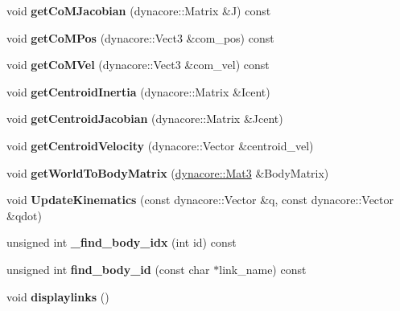 \begin{DoxyCompactItemize}
void {\bfseries get\+Co\+M\+Jacobian} (dynacore\+::\+Matrix \&J) const
\item 
\mbox{\label{classquadruped_1_1KinModel_a661bb6db781ce959b0605694d90e929c}} 
void {\bfseries get\+Co\+M\+Pos} (dynacore\+::\+Vect3 \&com\+\_\+pos) const
\item 
\mbox{\label{classquadruped_1_1KinModel_a686063155c2170cab5f9e1a81d21815f}} 
void {\bfseries get\+Co\+M\+Vel} (dynacore\+::\+Vect3 \&com\+\_\+vel) const
\item 
\mbox{\label{classquadruped_1_1KinModel_abf2c9fca9e57796ffd6e37d57e50c7da}} 
void {\bfseries get\+Centroid\+Inertia} (dynacore\+::\+Matrix \&Icent)
\item 
\mbox{\label{classquadruped_1_1KinModel_a41604c389d60e72f034de9751037fc07}} 
void {\bfseries get\+Centroid\+Jacobian} (dynacore\+::\+Matrix \&Jcent)
\item 
\mbox{\label{classquadruped_1_1KinModel_a6c29b49bed4c5e43bec0acf29202aca1}} 
void {\bfseries get\+Centroid\+Velocity} (dynacore\+::\+Vector \&centroid\+\_\+vel)
\item 
\mbox{\label{classquadruped_1_1KinModel_af3aad76f02bdcd895c26834af4e105b5}} 
void {\bfseries get\+World\+To\+Body\+Matrix} (\hyperlink{cppTypes_8h_adb7d462b35d31f0b2583b3e230a2a2c3}{dynacore\+::\+Mat3} \&Body\+Matrix)
\item 
\mbox{\label{classquadruped_1_1KinModel_a6c4408d0ebf6d12c7d47a6e16f6c36f8}} 
void {\bfseries Update\+Kinematics} (const dynacore\+::\+Vector \&q, const dynacore\+::\+Vector \&qdot)
\item 
\mbox{\label{classquadruped_1_1KinModel_a6f79faa74c7973c02c3b1b5b0ce5d2d7}} 
unsigned int {\bfseries \+\_\+find\+\_\+body\+\_\+idx} (int id) const
\item 
\mbox{\label{classquadruped_1_1KinModel_a707f290777fe1fd2db59269a34b88c87}} 
unsigned int {\bfseries find\+\_\+body\+\_\+id} (const char $\ast$link\+\_\+name) const
\item 
\mbox{\label{classquadruped_1_1KinModel_a44b631b0a7ec2c0398622fbb56039f07}} 
void {\bfseries displaylinks} ()
\end{DoxyCompactItemize}
